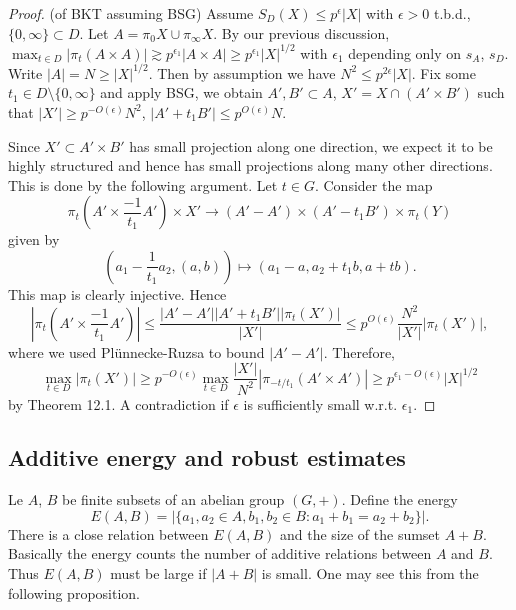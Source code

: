 \documentclass[12pt]{amsart}
\begin{document}
\begin{proof}{(of BKT assuming BSG)}
    Assume $S_D(X) \le p^{\epsilon} |X|$ with $\epsilon > 0$ t.b.d., $\{0,\infty\} \subset D$. Let $A = \pi_0 X \cup \pi_\infty X$. By our previous discussion, $\max_{t \in D} |\pi_t (A \times A)| \gtrsim p^{\epsilon_1}|A \times A| \ge p^{\epsilon_1} |X|^{1/2}$ with $\epsilon_1$ depending only on $s_A$, $s_D$. Write $|A| = N \ge |X|^{1/2}$. Then by assumption we have $N^2 \le p^{2\epsilon}|X|$. Fix some $t_1 \in D \setminus \{0,\infty\}$ and apply BSG, we obtain $A', B' \subset A$, $X' = X \cap (A' \times B')$ such that $|X'| \ge p^{-O(\epsilon)} N^2$, $|A' + t_1 B'| \le p^{O(\epsilon)} N$. 

    Since $X' \subset A' \times B'$ has small projection along one direction, we expect it to be highly structured and hence has small projections along many other directions. This is done by the following argument. Let $t \in G$. Consider the map
    \begin{equation*}
        \pi_t \left(A' \times \frac{-1}{t_1} A'\right) \times X' \to (A'-A') \times (A'-t_1 B') \times \pi_t(Y)
    \end{equation*}
    given by 
    \begin{equation*}
        \left(a_1 - \frac{1}{t_1} a_2, (a,b)\right) \mapsto (a_1-a, a_2 + t_1 b, a+tb).
    \end{equation*}
    This map is clearly injective. Hence
    \begin{equation*}
        \left|\pi_t \left(A' \times \frac{-1}{t_1} A'\right)\right| \le \frac{|A'-A'||A'+t_1B'||\pi_t(X')|}{|X'|} \le p^{O(\epsilon)} \frac{N^2}{|X'|} |\pi_t(X')|,
    \end{equation*}
    where we used Pl\"unnecke-Ruzsa to bound $|A'-A'|$. Therefore, 
    \begin{equation*}
        \max_{t \in D} |\pi_t(X')| \ge p^{-O(\epsilon)} \max_{t \in D} \frac{|X'|}{N^2} |\pi_{-t/t_1} (A' \times A')| \ge p^{\epsilon_1 - O(\epsilon)} |X|^{1/2} 
    \end{equation*}
    by Theorem 12.1. A contradiction if $\epsilon$ is sufficiently small w.r.t. $\epsilon_1$. 
\end{proof}

\subsection{Additive energy and robust estimates} \label{subsecaddenrob}

Le $A$, $B$ be finite subsets of an abelian group $(G,+)$. Define the energy 
\begin{equation*}
    E(A,B) = |\{a_1, a_2 \in A, b_1, b_2 \in B: a_1 + b_1 = a_2 + b_2\}|.
\end{equation*}
There is a close relation between $E(A,B)$ and the size of the sumset $A+B$. Basically the energy counts the number of additive relations between $A$ and $B$. Thus $E(A,B)$ must be large if $|A+B|$ is small. One may see this from the following proposition.
\end{document}
